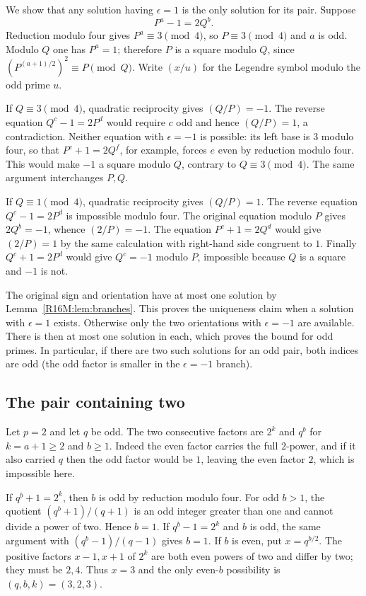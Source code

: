 \documentclass[11pt,a4paper]{article}
\begin{document}
We show that any solution having $\epsilon=1$ is the only
solution for its pair. Suppose
\[
                         P^a-1=2Q^b .
\]
Reduction modulo four gives $P^a\equiv3\pmod4$, so
$P\equiv3\pmod4$ and $a$ is odd. Modulo $Q$ one has $P^a=1$;
therefore $P$ is a square modulo $Q$, since
$(P^{(a+1)/2})^2\equiv P\pmod Q$.
Write $(x/u)$ for the Legendre symbol modulo the odd prime $u$.

If $Q\equiv3\pmod4$, quadratic reciprocity gives $(Q/P)=-1$.
The reverse equation $Q^c-1=2P^d$ would require $c$ odd
and hence $(Q/P)=1$, a contradiction. Neither equation with
$\epsilon=-1$ is possible: its left base is $3$ modulo four,
so that $P^e+1=2Q^f$, for example, forces $e$ even by reduction modulo
four. This would make $-1$ a square modulo $Q$, contrary to
$Q\equiv3\pmod4$. The same argument interchanges $P,Q$.

If $Q\equiv1\pmod4$, quadratic reciprocity gives $(Q/P)=1$.
The reverse equation $Q^c-1=2P^d$ is impossible modulo four.
The original equation modulo $P$ gives $2Q^b=-1$, whence
$(2/P)=-1$. The equation $P^c+1=2Q^d$ would give $(2/P)=1$
by the same calculation with right-hand side congruent to $1$.
Finally $Q^c+1=2P^d$ would give $Q^c=-1$ modulo $P$,
impossible because $Q$ is a square and $-1$ is not.

The original sign and orientation have at most one solution
by Lemma~\ref{R16M:lem:branches}. This proves the uniqueness claim
when a solution with $\epsilon=1$ exists. Otherwise only
the two orientations with $\epsilon=-1$ are available.
There is then at most one solution in each, which proves the
bound for odd primes. In particular, if there are two such
solutions for an odd pair, both indices are odd (the odd
factor is smaller in the $\epsilon=-1$ branch).

\subsection{The pair containing two}
Let $p=2$ and let $q$ be odd. The two consecutive factors
are $2^k$ and $q^b$ for $k=a+1\ge2$ and $b\ge1$.
Indeed the even factor carries the full $2$-power, and if it
also carried $q$ then the odd factor would be $1$, leaving
the even factor $2$, which is impossible here.

If $q^b+1=2^k$, then $b$ is odd by reduction modulo four.
For odd $b>1$, the quotient $(q^b+1)/(q+1)$ is an odd
integer greater than one and cannot divide a power of two.
Hence $b=1$.
If $q^b-1=2^k$ and $b$ is odd, the same argument with
$(q^b-1)/(q-1)$ gives $b=1$. If $b$ is even, put
$x=q^{b/2}$. The positive factors $x-1,x+1$ of $2^k$
are both even powers of two and differ by two; they must
be $2,4$. Thus $x=3$ and the only even-$b$ possibility
is $(q,b,k)=(3,2,3)$.
\end{document}
